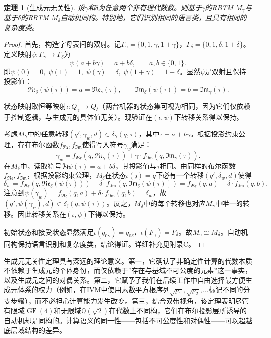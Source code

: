 \documentclass{ctexart}
\newtheorem{theorem}{定理}[section]
\newtheorem{proof}[theorem]{证明}
\begin{document}
	\begin{theorem}[生成元无关性]\label{thm:generator-independence}
		设$\gamma$和$\delta$为任意两个非有理代数数。则基于$\gamma$的RBTM $M_\gamma$与基于$\delta$的RBTM $M_\delta$自动机同构。特别地，它们识别相同的语言类，且具有相同的复杂度类。
	\end{theorem}
	\begin{proof}
		首先，构造字母表间的双射。记$\Gamma_\gamma = \{0,1,\gamma,1+\gamma\}$，$\Gamma_\delta = \{0,1,\delta,1+\delta\}$。定义映射$\psi:\Gamma_\gamma\to\Gamma_\delta$为
		\[
		\psi(a+b\gamma)=a+b\delta,\qquad a,b\in\{0,1\}.
		\]
		即$\psi(0)=0,\;\psi(1)=1,\;\psi(\gamma)=\delta,\;\psi(1+\gamma)=1+\delta$。显然$\psi$是双射且保持投影值：
		\[
		\mathfrak{Re}_\delta(\psi(\tau)) = a = \mathfrak{Re}_\gamma(\tau),\qquad
		\mathfrak{Im}_\delta(\psi(\tau)) = b = \mathfrak{Im}_\gamma(\tau).
		\]
		
		状态映射取恒等映射$\iota:Q_\gamma\to Q_\delta$（两台机器的状态集可视为相同，因为它们仅依赖于控制逻辑，与生成元的具体值无关）。现验证在$(\iota,\psi)$下转移关系得以保持。
		
		考虑$M_\gamma$中的任意转移$(q',\gamma_w,d)\in\delta_\gamma(q,\tau)$，其中$\tau=a+b\gamma$。根据投影约束公理，存在布尔函数$f_{\mathfrak{Re}},f_{\mathfrak{Im}}$使得写入符号$\gamma_w$满足：
		\[
		\gamma_w = f_{\mathfrak{Re}}(q,\mathfrak{Re}_\gamma(\tau)) + \gamma\cdot f_{\mathfrak{Im}}(q,\mathfrak{Im}_\gamma(\tau)).
		\]
		在$M_\delta$中，读取符号为$\psi(\tau)=a+b\delta$，其投影值与$\tau$相同。由同样的布尔函数$f_{\mathfrak{Re}},f_{\mathfrak{Im}}$，根据投影约束公理，$M_\delta$在状态$\iota(q)=q$下必有一个转移$(q',\delta_w,d)$使得
		\[
		\delta_w = f_{\mathfrak{Re}}(q,\mathfrak{Re}_\delta(\psi(\tau))) + \delta\cdot f_{\mathfrak{Im}}(q,\mathfrak{Im}_\delta(\psi(\tau))) = f_{\mathfrak{Re}}(q,a) + \delta\cdot f_{\mathfrak{Im}}(q,b).
		\]
		注意到$\psi(\gamma_w)=f_{\mathfrak{Re}}(q,a)+\delta\cdot f_{\mathfrak{Im}}(q,b)=\delta_w$，故$(q',\psi(\gamma_w),d)\in\delta_\delta(q,\psi(\tau))$。反之，$M_\delta$中的每个转移也对应$M_\gamma$中唯一的转移。因此转移关系在$(\iota,\psi)$下得以保持。
		
		初始状态和接受状态显然满足$\iota(q_{0\gamma})=q_{0\delta}$，$\iota(F_\gamma)=F_\delta$。故$M_\gamma\cong M_\delta$。自动机同构保持语言识别和复杂度类，结论得证。详细补充见附录C。
	\end{proof}
	
	生成元无关性定理具有深远的理论意义。第一，它确认了非确定性计算的代数本质不依赖于生成元的个体身份，而仅依赖于``存在与基域不可公度的元素''这一事实，以及生成元之间的对偶关系。第二，它赋予了我们在后续工作中自由选择最方便生成元体系的权力（例如，在IVM中使用素数平方根序列$\sqrt{p_1},\sqrt{p_2},\dots$标记不同的分支步骤），而不必担心计算能力发生改变。第三，结合双带视角，该定理表明尽管有限域$\operatorname{GF}(4)$和无限域$\mathbb{Q}(\sqrt{2})$在代数上不同构，它们在布尔投影层所诱导的自动机却是同构的。计算语义的同一性——包括不可公度性和对偶性——可以超越底层域结构的差异。
	
\end{document}
